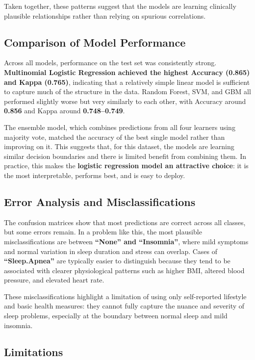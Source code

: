 \documentclass[
]{article}
\begin{document}
Taken together, these patterns suggest that the models are learning
clinically plausible relationships rather than relying on spurious
correlations.

\subsection{Comparison of Model
Performance}\label{comparison-of-model-performance}

Across all models, performance on the test set was consistently strong.
\textbf{Multinomial Logistic Regression achieved the highest Accuracy
(0.865) and Kappa (0.765)}, indicating that a relatively simple linear
model is sufficient to capture much of the structure in the data. Random
Forest, SVM, and GBM all performed slightly worse but very similarly to
each other, with Accuracy around \textbf{0.856} and Kappa around
\textbf{0.748--0.749}.

The ensemble model, which combines predictions from all four learners
using majority vote, matched the accuracy of the best single model
rather than improving on it. This suggests that, for this dataset, the
models are learning similar decision boundaries and there is limited
benefit from combining them. In practice, this makes the
\textbf{logistic regression model an attractive choice}: it is the most
interpretable, performs best, and is easy to deploy.

\subsection{Error Analysis and
Misclassifications}\label{error-analysis-and-misclassifications}

The confusion matrices show that most predictions are correct across all
classes, but some errors remain. In a problem like this, the most
plausible misclassifications are between \textbf{``None'' and
``Insomnia''}, where mild symptoms and normal variation in sleep
duration and stress can overlap. Cases of \textbf{``Sleep.Apnea''} are
typically easier to distinguish because they tend to be associated with
clearer physiological patterns such as higher BMI, altered blood
pressure, and elevated heart rate.

These misclassifications highlight a limitation of using only
self-reported lifestyle and basic health measures: they cannot fully
capture the nuance and severity of sleep problems, especially at the
boundary between normal sleep and mild insomnia.

\subsection{Limitations}\label{limitations}
\end{document}
